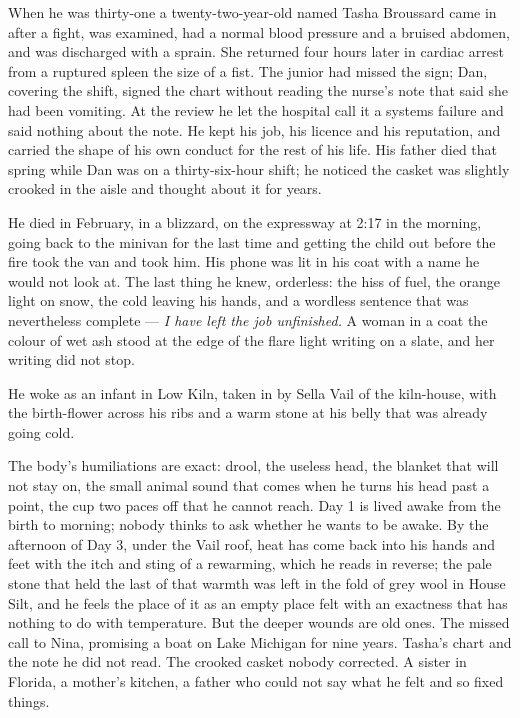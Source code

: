 \documentclass{design/chronicle}
\begin{document}
{When he was thirty-one a twenty-two-year-old named Tasha Broussard came in after a fight, was examined, had a normal blood pressure and a bruised abdomen, and was discharged with a sprain. She returned four hours later in cardiac arrest from a ruptured spleen the size of a fist. The junior had missed the sign; Dan, covering the shift, signed the chart without reading the nurse’s note that said she had been vomiting. At the review he let the hospital call it a systems failure and said nothing about the note. He kept his job, his licence and his reputation, and carried the shape of his own conduct for the rest of his life. His father died that spring while Dan was on a thirty-six-hour shift; he noticed the casket was slightly crooked in the aisle and thought about it for years.

He died in February, in a blizzard, on the expressway at 2:17 in the morning, going back to the minivan for the last time and getting the child out before the fire took the van and took him. His phone was lit in his coat with a name he would not look at. The last thing he knew, orderless: the hiss of fuel, the orange light on snow, the cold leaving his hands, and a wordless sentence that was nevertheless complete — \emph{I have left the job unfinished.} A woman in a coat the colour of wet ash stood at the edge of the flare light writing on a slate, and her writing did not stop.

He woke as an infant in Low Kiln, taken in by Sella Vail of the kiln-house, with the birth-flower across his ribs and a warm stone at his belly that was already going cold.

The body’s humiliations are exact: drool, the useless head, the blanket that will not stay on, the small animal sound that comes when he turns his head past a point, the cup two paces off that he cannot reach. Day 1 is lived awake from the birth to morning; nobody thinks to ask whether he wants to be awake. By the afternoon of Day 3, under the Vail roof, heat has come back into his hands and feet with the itch and sting of a rewarming, which he reads in reverse; the pale stone that held the last of that warmth was left in the fold of grey wool in House Silt, and he feels the place of it as an empty place felt with an exactness that has nothing to do with temperature. But the deeper wounds are old ones. The missed call to Nina, promising a boat on Lake Michigan for nine years. Tasha’s chart and the note he did not read. The crooked casket nobody corrected. A sister in Florida, a mother’s kitchen, a father who could not say what he felt and so fixed things.

}
\end{document}
